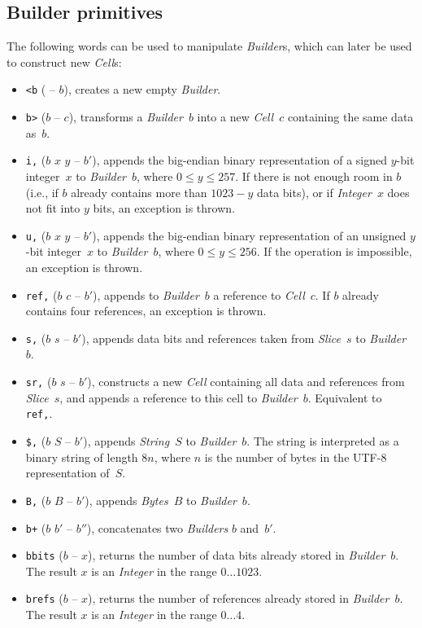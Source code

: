 \documentclass[12pt,oneside]{article}
\def\mysubsection#1{\subsection{#1}\fancyhead[C]{\small{\textsc{\textrm{\thesubsection.} #1}}}}
\begin{document}
\mysubsection{Builder primitives}\label{p:builder.ops}
The following words can be used to manipulate {\em Builder\/}s, which can later be used to construct new {\em Cell\/}s:
\begin{itemize}
\item {\tt <b} ( -- $b$), creates a new empty {\em Builder}.
\item {\tt b>} ($b$ -- $c$), transforms a {\em Builder\/}~$b$ into a new {\em Cell\/}~$c$ containing the same data as~$b$.
\item {\tt i,} ($b$ $x$ $y$ -- $b'$), appends the big-endian binary representation of a signed $y$-bit integer~$x$ to {\em Builder\/}~$b$, where $0\leq y\leq 257$. If there is not enough room in $b$ (i.e., if $b$ already contains more than $1023-y$ data bits), or if {\em Integer\/}~$x$ does not fit into $y$ bits, an exception is thrown.
\item {\tt u,} ($b$ $x$ $y$ -- $b'$), appends the big-endian binary representation of an unsigned $y$-bit integer~$x$ to {\em Builder\/}~$b$, where $0\leq y\leq 256$. If the operation is impossible, an exception is thrown.
\item {\tt ref,} ($b$ $c$ -- $b'$), appends to {\em Builder\/}~$b$ a reference to {\em Cell\/}~$c$. If $b$ already contains four references, an exception is thrown.
\item {\tt s,} ($b$ $s$ -- $b'$), appends data bits and references taken from {\em Slice\/}~$s$ to {\em Builder\/}~$b$.
\item {\tt sr,} ($b$ $s$ -- $b'$), constructs a new {\em Cell\/} containing all data and references from {\em Slice\/}~$s$, and appends a reference to this cell to {\em Builder\/}~$b$. Equivalent to {\tt <b swap s, b> ref,}.
\item {\tt \$,} ($b$ $S$ -- $b'$), appends {\em String\/}~$S$ to {\em Builder\/}~$b$. The string is interpreted as a binary string of length $8n$, where $n$ is the number of bytes in the UTF-8 representation of~$S$.
\item {\tt B,} ($b$ $B$ -- $b'$), appends {\em Bytes\/}~$B$ to {\em Builder\/}~$b$.
\item {\tt b+} ($b$ $b'$ -- $b''$), concatenates two {\em Builders\/} $b$ and~$b'$.
\item {\tt bbits} ($b$ -- $x$), returns the number of data bits already stored in {\em Builder\/}~$b$. The result $x$ is an {\em Integer\/} in the range $0\dots1023$.
\item {\tt brefs} ($b$ -- $x$), returns the number of references already stored in {\em Builder\/}~$b$. The result $x$ is an {\em Integer\/} in the range $0\dots4$.

\end{itemize}
\end{document}

